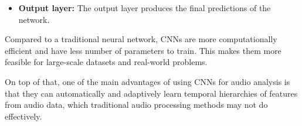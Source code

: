 \begin{itemize}
\item \textbf{Output layer:} The output layer produces the final predictions of the network.

\end{itemize}

Compared to a traditional neural network, CNNs are more computationally efficient and have less number of parameters to train. This makes them more feasible for large-scale datasets and real-world problems.

On top of that, one of the main advantages of using CNNs for audio analysis is that they can automatically and adaptively learn temporal hierarchies of features from audio data, which traditional audio processing methods may not do effectively. 







\newpage


